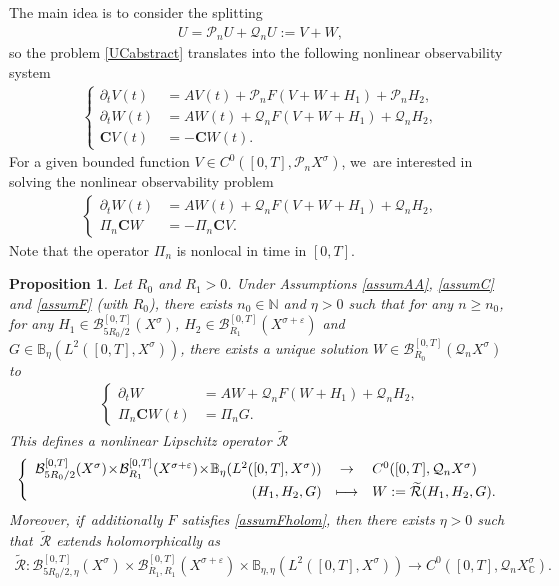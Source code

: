 \documentclass[11pt]{article}
\providecommand{\dpl}{\displaystyle}
\newcommand\mto{\mathchoice{\longmapsto}{\mapsto}{\mapsto}{\mapsto}}
\newtheorem{proposition}[theorem]{Proposition}
\theoremstyle{definition}
\let\mc\mathcal
\let\veps\varepsilon
\newcommand{\B}{\mc{B}}
\newcommand{\N}{\mathbb{N}}
\newcommand{\Q}{\mathcal{Q}}
\renewcommand{\P}{\mathcal{P}}
\newcommand{\bC}{\boldsymbol{C}}
\begin{document}
The main idea is to consider the splitting
\begin{align*}
U=\P_n U+\Q_n U:=V+W,
\end{align*}
so the problem \eqref{UCabstract} translates into the following nonlinear observability system
\begin{align*}
\left\{\begin{array}{rl}
\partial_t V(t)&=AV(t)+\P_n F( V+W+H_{1})+\P_{n}H_{2}, \\[3pt]
\partial_t W(t)&=AW(t)+\Q_n F(V+W+H_{1})+\Q_{n}H_{2}, \\[3pt]
\bC V(t)&=-\bC W(t).
\end{array}\right.
\end{align*}
For a given bounded function $V\in C^0([0, T], \P_n X^\sigma)$, we~are interested in solving the nonlinear observability problem
\begin{align*}
\left\{\begin{array}{rl}
\partial_t W(t)&=AW(t)+\Q_n F(V+W+H_{1})+\Q_{n}H_{2}, \\[3pt]
\Pi_n\bC W &=- \Pi_n\bC V.
\end{array}\right.
\end{align*}
Note that the operator $\Pi_{n}$ is nonlocal in time in $[0,T]$.
\begin{proposition}\label{propabstract}
Let $R_{0}$ and $R_{1}>0$. Under Assumptions \ref{assumAA}, \ref{assumC} and \ref{assumF} (with $R_{0}$), there exists $n_{0}\in \N$ and $\eta>0$ such that for any $n\geq n_{0}$, for any $H_{1}\in \B_{5R_{0}/2}^{[0,T]}(X^{\sigma})$, $H_{2}\in \B_{R_{1}}^{[0,T]}(X^{\sigma+\veps})$ and $G\in \mathbb{B}_{\eta}(L^2([0, T], X^{\sigma}))$, there exists a unique solution $W\in \B_{R_{0}}^{[0,T]}(\Q_n X^{\sigma})$ to
\begin{align}\label{eqWG}
\left\{\begin{array}{rl}
\partial_t W&=AW+\Q_n F(W+H_{1})+\Q_{n}H_{2}, \\[3pt]
\Pi_n\bC W(t) &=\Pi_nG.
\end{array}\right.
\end{align}
This defines a nonlinear Lipschitz operator $\mathcal{\widetilde{R}}$
\begin{align}
\left\{\begin{array}{rcl}
\B_{5R_{0}/2}^{[0,T]}(X^{\sigma}) \!\times\! \B_{R_{1}}^{[0,T]}(X^{\sigma+\veps}) \!\times\! \mathbb{B}_{\eta}(L^{2}([0,T],X^{\sigma})) & \dpl\to& C^0([0, T], \Q_{n }X^{\sigma})\\[3pt]
(H_{1},H_{2},G)&\dpl\mto& W:=\mathcal{\widetilde{R}}(H_{1},H_{2},G).
\end{array}\right.
\end{align}
Moreover, if~additionally $F$ satisfies \cref{assumFholom}, then there exists $\eta>0$ such that~$\mathcal{\widetilde{R}}$ extends holomorphically as
\begin{align*}
\mathcal{\widetilde{R}}: \B_{5R_{0}/2,\eta}^{[0,T]}(X^{\sigma}) \times \B_{R_{1}, R_{1}}^{[0,T]}(X^{\sigma+\veps})\times \mathbb{B}_{\eta,\eta}(L^{2}([0,T],X^{\sigma})) \to C^0([0, T], \Q_{n }X^{\sigma}_{\mathbb{C}}).
\end{align*}
\end{proposition}
\end{document}
